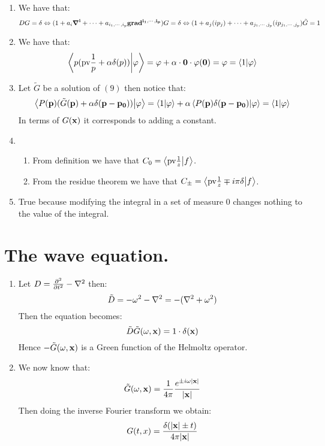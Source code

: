 \documentclass[10pt,a4paper]{book}
\begin{document}
\begin{enumerate}

\item We have that:
\[
DG = \delta \Leftrightarrow (1 + a_i \vb{\grad^i} + \cdots + a_{i_1, \cdots, i_p} \vb{grad^{i_1, \cdots, i_p}}) G = \delta \Leftrightarrow (1 + a_j (i p_j) + \cdots + a_{j_1, \cdots, j_p} ( i p_{j_1, \cdots, j_p}) \tilde{G} = 1
\]

\item We have that:
\[
\bra{p (\text{pv} \frac{1}{p} + \alpha \delta(p))}\ket{\varphi} = \varphi + \alpha \cdot \vb{0} \cdot \varphi(\vb{0}) = \varphi = \bra{1}\ket{\varphi}
\]

\item Let $\tilde{G}$ be a solution of $(9)$ then notice that:
\[
\bra{P(\vb{p}) (\tilde{G}(\vb{p}) + \alpha \delta(\vb{p} - \vb{p_0}))}\ket{\varphi} = \bra{1}\ket{\varphi} + \alpha \bra{P(\vb{p}) \delta(\vb{p} - \vb{p_0})}\ket{\varphi} = \bra{1}\ket{\varphi}
\]
In terms of $G(\vb{x})$ it corresponds to adding a constant.

\item 
\begin{enumerate}

\item From definition we have that $C_0 = \braket{\text{pv}\frac{1}{z}}{f}$. 

\item From the residue theorem we have that $C_{\pm} = \braket{\text{pv}\frac{1}{z} \mp i \pi \delta }{f}$.

\end{enumerate}

\item True because modifying the integral in a set of measure 0 changes nothing to the value of the integral.

\end{enumerate}

\section{The wave equation.}

\begin{enumerate}

\item Let $D = \pdv[2]{}{t} - \laplacian$ then:
\[
\tilde{D} = -\omega^2 - \laplacian = - (\laplacian + \omega^2)
\]
Then the equation becomes:
\[
\tilde{D} \tilde{G}(\omega, \vb{x}) = 1 \cdot \delta(\vb{x})
\]
Hence $-\tilde{G}(\omega, \vb{x})$ is a Green function of the Helmoltz operator.

\item We now know that:
\[
\tilde{G}(\omega, \vb{x}) = \frac{1}{4\pi} \frac{e^{\pm i \omega |\vb{x}|}}{|\vb{x}|}
\]
Then doing the inverse Fourier transform we obtain:
\[
G(t, x) = \frac{\delta(|\vb{x}| \pm t)}{4 \pi |\vb{x}|}
\]

\end{enumerate}
\end{document}
